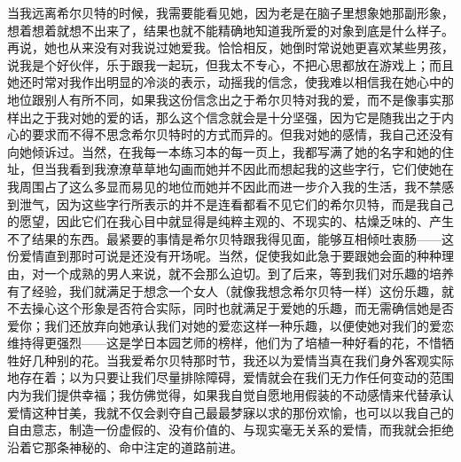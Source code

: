 \par 当我远离希尔贝特的时候，我需要能看见她，因为老是在脑子里想象她那副形象，想着想着就想不出来了，结果也就不能精确地知道我所爱的对象到底是什么样子。再说，她也从来没有对我说过她爱我。恰恰相反，她倒时常说她更喜欢某些男孩，说我是个好伙伴，乐于跟我一起玩，但我太不专心，不把心思都放在游戏上；而且她还时常对我作出明显的冷淡的表示，动摇我的信念，使我难以相信我在她心中的地位跟别人有所不同，如果我这份信念出之于希尔贝特对我的爱，而不是像事实那样出之于我对她的爱的话，那么这个信念就会是十分坚强，因为它是随我出之于内心的要求而不得不思念希尔贝特时的方式而异的。但我对她的感情，我自己还没有向她倾诉过。当然，在我每一本练习本的每一页上，我都写满了她的名字和她的住址，但当我看到我潦潦草草地勾画而她并不因此而想起我的这些字行，它们使她在我周围占了这么多显而易见的地位而她并不因此而进一步介入我的生活，我不禁感到泄气，因为这些字行所表示的并不是连看都看不见它们的希尔贝特，而是我自己的愿望，因此它们在我心目中就显得是纯粹主观的、不现实的、枯燥乏味的、产生不了结果的东西。最紧要的事情是希尔贝特跟我得见面，能够互相倾吐衷肠——这份爱情直到那时可说是还没有开场呢。当然，促使我如此急于要跟她会面的种种理由，对一个成熟的男人来说，就不会那么迫切。到了后来，等到我们对乐趣的培养有了经验，我们就满足于想念一个女人（就像我想念希尔贝特一样）这份乐趣，就不去操心这个形象是否符合实际，同时也就满足于爱她的乐趣，而无需确信她是否爱你；我们还放弃向她承认我们对她的爱恋这样一种乐趣，以便使她对我们的爱恋维持得更强烈——这是学日本园艺师的榜样，他们为了培植一种好看的花，不惜牺牲好几种别的花。当我爱希尔贝特那时节，我还以为爱情当真在我们身外客观实际地存在着；以为只要让我们尽量排除障碍，爱情就会在我们无力作任何变动的范围内为我们提供幸福；我仿佛觉得，如果我自觉自愿地用假装的不动感情来代替承认爱情这种甘美，我就不仅会剥夺自己最最梦寐以求的那份欢愉，也可以以我自己的自由意志，制造一份虚假的、没有价值的、与现实毫无关系的爱情，而我就会拒绝沿着它那条神秘的、命中注定的道路前进。
